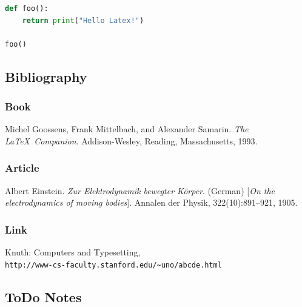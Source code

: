 \documentclass[12pt]{article}
\begin{document}
\begin{lstlisting}[language=Python, caption=Python example]
def foo():
    return print("Hello Latex!")

foo()
\end{lstlisting}


\subsection{Bibliography}

\subsubsection{Book}
\begin{thebibliography}{1}
Michel Goossens, Frank Mittelbach, and Alexander Samarin. 
\textit{The \LaTeX\ Companion}. 
Addison-Wesley, Reading, Massachusetts, 1993.

\subsubsection{Article}
Albert Einstein. 
\textit{Zur Elektrodynamik bewegter K{\"o}rper}. (German) 
[\textit{On the electrodynamics of moving bodies}]. 
Annalen der Physik, 322(10):891–921, 1905.

\subsubsection{Link}
Knuth: Computers and Typesetting,
\\\texttt{http://www-cs-faculty.stanford.edu/\~{}uno/abcde.html}
\end{thebibliography}

\subsection{ToDo Notes}
\end{document}
